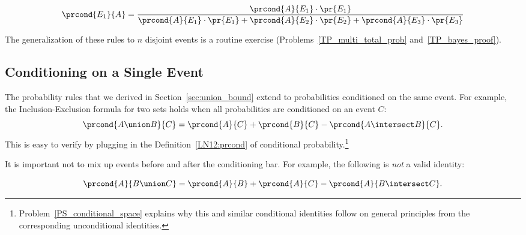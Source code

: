 \begin{rul*}
\[
\prcond{E_1}{A} = \frac{\prcond{A}{E_1}\cdot \pr{E_1}}
                       {\prcond{A}{E_1} \cdot \pr{E_1} +
                        \prcond{A}{E_2} \cdot \pr{E_2} +
                        \prcond{A}{E_3} \cdot \pr{E_3}}
\]
\end{rul*}

The generalization of these rules to $n$ disjoint events is a routine
exercise (Problems~\ref{TP_multi_total_prob} and~\ref{TP_bayes_proof}).

\subsection{Conditioning on a Single Event}\label{cond_ident_subsec}

The probability rules that we derived in Section~\ref{sec:union_bound}
extend to probabilities conditioned on the same event.  For example,
the Inclusion-Exclusion formula for two sets holds when all
probabilities are conditioned on an event $C$:
\[
\prcond{A \union B}{C} = \prcond{A}{C} + \prcond{B}{C} - \prcond{A \intersect B}{C}.
\]
This is easy to verify by plugging in the Definition~\ref{LN12:prcond}
of conditional 
probability.\footnote{Problem~\ref{PS_conditional_space} explains why
  this and similar conditional identities follow on general principles
  from the corresponding unconditional identities.}

It is important not to mix up events before and after the conditioning
bar.  For example, the following is \emph{not} a valid identity:
%
\begin{falseclm*}
\begin{equation}\label{LN12:fc}
\prcond{A}{B \union C} = \prcond{A}{B} + \prcond{A}{C} - \prcond{A}{B \intersect C}.
\end{equation}
\end{falseclm*}

